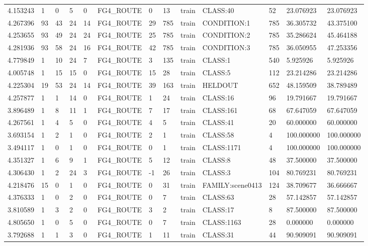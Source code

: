 \begin{tabular}{lllllllllllll}
4.153243 & 1 & 0 & 5 & 0 & FG4\_ROUTE & 0 & 13 & train & CLASS:40 & 52 & 23.076923 & 23.076923 \\
4.267396 & 93 & 43 & 24 & 14 & FG4\_ROUTE & 29 & 785 & train & CONDITION:1 & 785 & 36.305732 & 43.375100 \\
4.253655 & 93 & 49 & 24 & 24 & FG4\_ROUTE & 25 & 785 & train & CONDITION:2 & 785 & 35.286624 & 45.464188 \\
4.281936 & 93 & 58 & 24 & 16 & FG4\_ROUTE & 42 & 785 & train & CONDITION:3 & 785 & 36.050955 & 47.253356 \\
4.779849 & 1 & 10 & 24 & 7 & FG4\_ROUTE & 3 & 135 & train & CLASS:1 & 540 & 5.925926 & 5.925926 \\
4.005748 & 1 & 15 & 15 & 0 & FG4\_ROUTE & 15 & 28 & train & CLASS:5 & 112 & 23.214286 & 23.214286 \\
4.225304 & 19 & 53 & 24 & 14 & FG4\_ROUTE & 39 & 163 & train & HELDOUT & 652 & 48.159509 & 38.789489 \\
4.257877 & 1 & 1 & 14 & 0 & FG4\_ROUTE & 1 & 24 & train & CLASS:16 & 96 & 19.791667 & 19.791667 \\
3.896489 & 1 & 8 & 11 & 1 & FG4\_ROUTE & 7 & 17 & train & CLASS:161 & 68 & 67.647059 & 67.647059 \\
4.267561 & 1 & 4 & 5 & 0 & FG4\_ROUTE & 4 & 5 & train & CLASS:41 & 20 & 60.000000 & 60.000000 \\
3.693154 & 1 & 2 & 1 & 0 & FG4\_ROUTE & 2 & 1 & train & CLASS:58 & 4 & 100.000000 & 100.000000 \\
3.494117 & 1 & 0 & 1 & 0 & FG4\_ROUTE & 0 & 1 & train & CLASS:1171 & 4 & 100.000000 & 100.000000 \\
4.351327 & 1 & 6 & 9 & 1 & FG4\_ROUTE & 5 & 12 & train & CLASS:8 & 48 & 37.500000 & 37.500000 \\
4.306430 & 1 & 2 & 24 & 3 & FG4\_ROUTE & -1 & 26 & train & CLASS:3 & 104 & 80.769231 & 80.769231 \\
4.218476 & 15 & 0 & 1 & 0 & FG4\_ROUTE & 0 & 31 & train & FAMILY:scene0413 & 124 & 38.709677 & 36.666667 \\
4.376333 & 1 & 0 & 2 & 0 & FG4\_ROUTE & 0 & 7 & train & CLASS:63 & 28 & 57.142857 & 57.142857 \\
3.810589 & 1 & 3 & 2 & 0 & FG4\_ROUTE & 3 & 2 & train & CLASS:17 & 8 & 87.500000 & 87.500000 \\
4.805650 & 1 & 0 & 5 & 0 & FG4\_ROUTE & 0 & 7 & train & CLASS:1163 & 28 & 0.000000 & 0.000000 \\
3.792688 & 1 & 1 & 3 & 0 & FG4\_ROUTE & 1 & 11 & train & CLASS:31 & 44 & 90.909091 & 90.909091 \\

\end{tabular}
